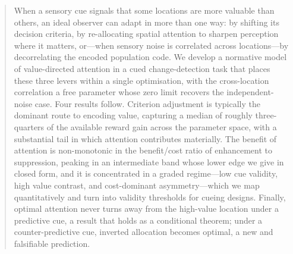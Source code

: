 
\begin{abstract}
\noindent
When a sensory cue signals that some locations are more valuable than
others, an ideal observer can adapt in more than one way: by shifting its
decision criteria, by re-allocating spatial attention to sharpen
perception where it matters, or---when sensory noise is correlated across
locations---by decorrelating the encoded population code. We develop a
normative model of value-directed attention in a cued change-detection
task that places these three levers within a single optimisation, with
the cross-location correlation a free parameter whose zero limit recovers
the independent-noise case. Four results follow. Criterion adjustment is
typically the dominant route to encoding value, capturing a median of
roughly three-quarters of the available reward gain across the parameter
space, with a substantial tail in which attention contributes materially.
The benefit of attention is non-monotonic in the benefit/cost ratio of
enhancement to suppression, peaking in an intermediate band whose lower
edge we give in closed form, and it is concentrated in a graded
regime---low cue validity, high value contrast, and cost-dominant
asymmetry---which we map quantitatively and turn into validity thresholds
for cueing designs. Finally, optimal attention never turns away from the
high-value location under a predictive cue, a result that holds as a
conditional theorem; under a counter-predictive cue, inverted allocation
becomes optimal, a new and falsifiable prediction.
\end{abstract}
